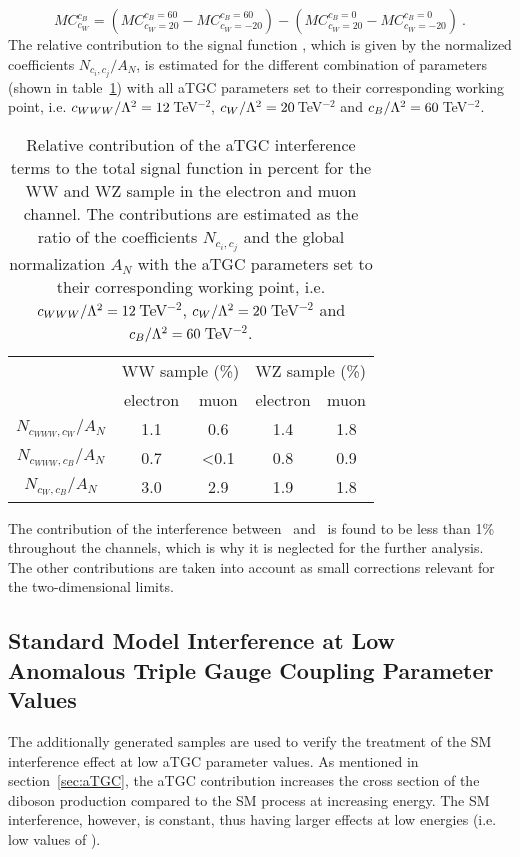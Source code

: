 \begin{equation}
MC_{c_{W}}^{c_{B}} = \left( MC_{c_{W} =20}^{c_{B} =60}-MC_{c_{W}=-20}^{c_{B} =60} \right) - \left( MC_{c_{W}=20}^{c_B=0}-MC_{c_{W}=-20}^{c_B=0} \right) ~.
\end{equation}
The relative contribution to the signal function , which is given by the normalized coefficients $N_{c_i,c_j}/A_N$, is estimated for the different combination of parameters (shown in table~\ref{tab:signal:relcoef}) with all aTGC parameters set to their corresponding working point, i.e. $c_{WWW}/\Lambda^2=12$\,TeV$^{-2}$, $c_{W}/\Lambda^2=20$\,TeV$^{-2}$ and $c_{B}/\Lambda^2=60$\,TeV$^{-2}$.
\begin{table}
	\centering
	\caption[Relative contribution of the aTGC interference terms to the total signal function]{Relative contribution of the aTGC interference terms to the total signal function in percent for the WW and WZ sample in the electron and muon channel. The contributions are estimated as the ratio of the coefficients $N_{c_i,c_j}$ and the global normalization $A_N$ with the aTGC parameters set to their corresponding working point, i.e. $c_{WWW}/\Lambda^2=12$\,TeV$^{-2}$, $c_{W}/\Lambda^2=20$\,TeV$^{-2}$ and $c_{B}/\Lambda^2=60$\,TeV$^{-2}$.}
	\label{tab:signal:relcoef}
	\begin{tabular}{ccccc}
	\hline
	 & \multicolumn{2}{c}{WW sample (\%)} & \multicolumn{2}{c}{WZ sample (\%)} \\
	 & electron & muon & electron & muon \\
	\hline
	$N_{c_{WWW},c_W}/A_N$ & 1.1 & 0.6  & 1.4 & 1.8 \\
	$N_{c_{WWW},c_B}/A_N$ & 0.7 & <0.1 & 0.8 & 0.9 \\
	$N_{c_W,c_B}/A_N$     & 3.0 & 2.9  & 1.9 & 1.8 \\
	\hline
	\end{tabular}
\end{table}
The contribution of the interference between \Tcwww \ and \Tcb \ is found to be less than 1\% throughout the channels, which is why it is neglected for the further analysis. 
The other contributions are taken into account as small corrections relevant for the two-dimensional limits.
\subsection{Standard Model Interference at Low Anomalous Triple Gauge Coupling Parameter Values}
\label{sec:SMint}
The additionally generated samples are used to verify the treatment of the SM interference effect at low aTGC parameter values. As mentioned in section~\ref{sec:aTGC}, the aTGC contribution increases the cross section of the diboson production compared to the SM process at increasing energy. The SM interference, however, is constant, thus having larger effects at low energies (i.e. low values of \MWV).\\

